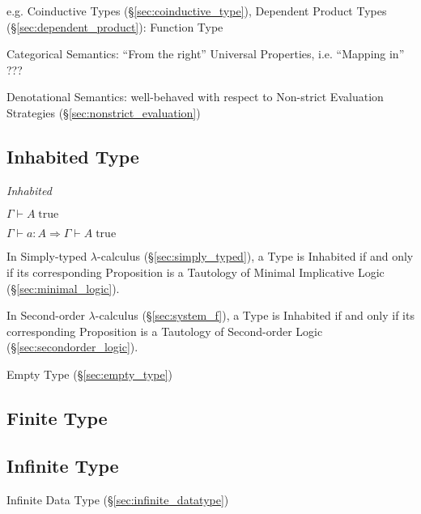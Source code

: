e.g. Coinductive Types (\S\ref{sec:coinductive_type}), Dependent
Product Types (\S\ref{sec:dependent_product}): Function Type

Categorical Semantics: ``From the right'' Universal Properties, i.e.
``Mapping in'' ???

Denotational Semantics: well-behaved with respect to Non-strict
Evaluation Strategies (\S\ref{sec:nonstrict_evaluation})



\subsection{Inhabited Type}\label{sec:inhabited_type}

\emph{Inhabited}

$\Gamma \vdash A\;\mathrm{true}$

$\Gamma \vdash a:A \Rightarrow \Gamma \vdash A\;\mathrm{true}$

In Simply-typed $\lambda$-calculus (\S\ref{sec:simply_typed}), a Type
is Inhabited if and only if its corresponding Proposition is a
Tautology of Minimal Implicative Logic (\S\ref{sec:minimal_logic}).

In Second-order $\lambda$-calculus (\S\ref{sec:system_f}), a
Type is Inhabited if and only if its corresponding Proposition is a
Tautology of Second-order Logic (\S\ref{sec:secondorder_logic}).

Empty Type (\S\ref{sec:empty_type})



\subsection{Finite Type}\label{sec:finite_type}

\subsection{Infinite Type}\label{sec:infinite_type}

Infinite Data Type (\S\ref{sec:infinite_datatype})



